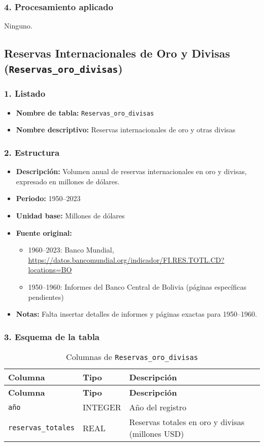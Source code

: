 \documentclass[12pt,a4paper]{article}
\begin{document}
\subsubsection*{4. Procesamiento aplicado}
Ninguno.


\newpage
\subsection{Reservas Internacionales de Oro y Divisas (\texttt{Reservas\_oro\_divisas})}

\subsubsection*{1. Listado}
\begin{itemize}
  \item \textbf{Nombre de tabla:} \texttt{Reservas\_oro\_divisas}
  \item \textbf{Nombre descriptivo:} Reservas internacionales de oro y otras divisas
\end{itemize}

\subsubsection*{2. Estructura}
\begin{itemize}
  \item \textbf{Descripción:} Volumen anual de reservas internacionales en oro y divisas, expresado en millones de dólares.
  \item \textbf{Periodo:} 1950--2023
  \item \textbf{Unidad base:} Millones de dólares
  \item \textbf{Fuente original:}
    \begin{itemize}
      \item 1960--2023: Banco Mundial, \url{https://datos.bancomundial.org/indicador/FI.RES.TOTL.CD?locations=BO}
      \item 1950--1960: Informes del Banco Central de Bolivia (páginas específicas pendientes)
    \end{itemize}
  \item \textbf{Notas:} Falta insertar detalles de informes y páginas exactas para 1950–1960.
\end{itemize}

\subsubsection*{3. Esquema de la tabla}
\begin{longtable}{@{}lll@{}}
\caption{Columnas de \texttt{Reservas\_oro\_divisas}}\\
\toprule
\textbf{Columna}       & \textbf{Tipo} & \textbf{Descripción} \\
\midrule
\endfirsthead
\toprule
\textbf{Columna}       & \textbf{Tipo} & \textbf{Descripción} \\
\midrule
\endhead
\bottomrule
\endfoot
\texttt{año}             & INTEGER & Año del registro \\
\texttt{reservas\_totales} & REAL    & Reservas totales en oro y divisas (millones USD) \\
\end{longtable}
\end{document}
